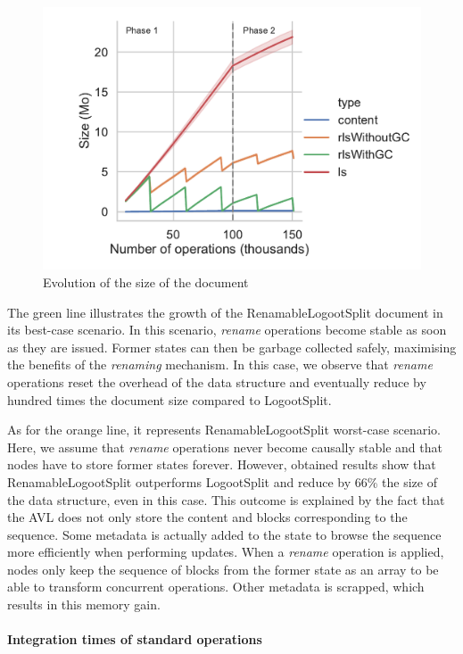 \documentclass[sigplan,10pt]{acmart}
\begin{document}
\begin{figure}
    \centering
    \includegraphics[width=0.9\columnwidth]{img/snapshots-sizes.pdf}
    \caption{Evolution of the size of the document}
    \label{fig:evolution-document-size}
\end{figure}

The green line illustrates the growth of the RenamableLogootSplit document in its best-case scenario.
In this scenario, \emph{rename} operations become stable as soon as they are issued.
Former states can then be garbage collected safely, maximising the benefits of the \emph{renaming} mechanism.
In this case, we observe that \emph{rename} operations reset the overhead of the data structure and eventually reduce by hundred times the document size compared to LogootSplit.

As for the orange line, it represents RenamableLogootSplit worst-case scenario.
Here, we assume that \emph{rename} operations never become causally stable and that nodes have to store former states forever.
However, obtained results show that RenamableLogootSplit outperforms LogootSplit and reduce by 66\% the size of the data structure, even in this case.
This outcome is explained by the fact that the AVL does not only store the content and blocks corresponding to the sequence.
Some metadata is actually added to the state to browse the sequence more efficiently when performing updates.
When a \emph{rename} operation is applied, nodes only keep the sequence of blocks from the former state as an array to be able to transform concurrent operations.
Other metadata is scrapped, which results in this memory gain.

\paragraph{Integration times of standard operations}
\end{document}
